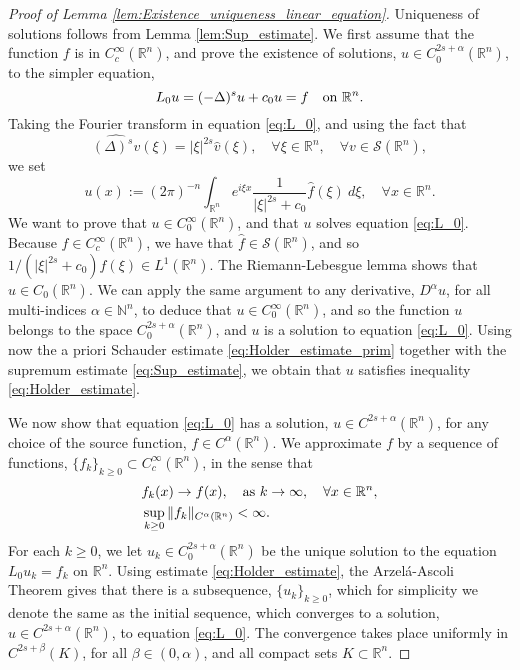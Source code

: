 \documentclass[11pt,reqno]{amsart}
\theoremstyle{definition}
\theoremstyle{remark}
\begin{document}
\begin{proof}[Proof of Lemma \ref{lem:Existence_uniqueness_linear_equation}]
Uniqueness of solutions follows from Lemma \ref{lem:Sup_estimate}. We first assume that the function $f$ is in $C^{\infty}_c({\mathbb{R}}^n)$, and prove the existence of solutions, $u \in C^{2s+\alpha}_0({\mathbb{R}}^n)$, to the simpler equation,
\begin{equation}
\label{eq:L_0}
L_0 u = (-\Delta)^s u +c_0 u =f\quad\hbox{on } {\mathbb{R}}^n.
\end{equation}
Taking the Fourier transform in equation \eqref{eq:L_0}, and using the fact that
$$
\widehat{(\Delta)^s v}(\xi) = |\xi|^{2s} \widehat v(\xi),\quad\forall \xi\in{\mathbb{R}}^n, \quad\forall v \in {{\mathcal{S}}}({\mathbb{R}}^n),
$$
we set
$$
u(x):=(2\pi)^{-n} \int_{{\mathbb{R}}^n}e^{i\xi x}\frac{1}{|\xi|^{2s}+c_0}\widehat f(\xi)\ d\xi,\quad\forall x\in{\mathbb{R}}^n.
$$
We want to prove that $u \in C^{\infty}_0({\mathbb{R}}^n)$, and that $u$ solves equation \eqref{eq:L_0}. Because $f \in C^{\infty}_c({\mathbb{R}}^n)$, we have that $\widehat f \in {{\mathcal{S}}}({\mathbb{R}}^n)$, and so $1/(|\xi|^{2s}+c_0)\widehat f(\xi) \in L^1({\mathbb{R}}^n)$. The Riemann-Lebesgue lemma \cite[Theorem 8.22 f]{Folland_realanalysis} shows that $u\in C_0({\mathbb{R}}^n)$. We can apply the same argument to any derivative, $D^{\alpha} u$, for all multi-indices $\alpha\in {\mathbb{N}}^{n}$, to deduce that $u \in C^{\infty}_0({\mathbb{R}}^n)$, and so the function $u$ belongs to the space $C^{2s+\alpha}_0({\mathbb{R}}^n)$, and $u$ is a solution to equation \eqref{eq:L_0}. Using now the a priori Schauder estimate \eqref{eq:Holder_estimate_prim} together with the supremum estimate \eqref{eq:Sup_estimate}, we obtain that $u$ satisfies inequality \eqref{eq:Holder_estimate}.

We now show that equation \eqref{eq:L_0} has a  solution, $u\in C^{2s+\alpha}({\mathbb{R}}^n)$, for any choice of the source function, $f\in C^{\alpha}({\mathbb{R}}^n)$. We approximate $f$ by a sequence of functions, $\{f_k\}_{k\geq 0}\subset C^{\infty}_c({\mathbb{R}}^n)$, in the sense that
\begin{align*}
&f_k(x)\rightarrow f(x),\quad\hbox{as } k\rightarrow\infty,\quad\forall x\in {\mathbb{R}}^n,\\
&\sup_{k\geq 0} \|f_k\|_{C^{\alpha}({\mathbb{R}}^n)} <\infty.
\end{align*}
For each $k \geq 0$, we let $u_k\in C^{2s+\alpha}_0({\mathbb{R}}^n)$ be the unique solution to the equation $L_0 u_k =f_k$ on ${\mathbb{R}}^n$. Using estimate \eqref{eq:Holder_estimate}, the Arzel\'a-Ascoli Theorem gives that there is a subsequence, $\{u_k\}_{k\geq 0}$, which for simplicity we denote the same as the initial sequence, which converges to a solution, $u\in C^{2s+\alpha}({\mathbb{R}}^n)$, to equation \eqref{eq:L_0}. The convergence takes place uniformly in $C^{2s+\beta}(K)$, for all $\beta\in (0,\alpha)$, and all compact sets $K\subset {\mathbb{R}}^n$.


\end{proof}
\end{document}
